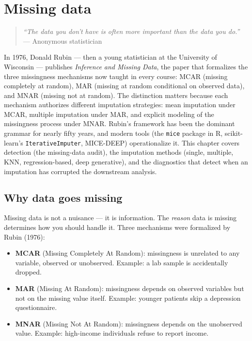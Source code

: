 \chapter{Missing data}
\label{ch:missing-data}

\begin{quote}
\emph{``The data you don't have is often more important than the data you do.''}
--- Anonymous statistician
\end{quote}

In 1976, Donald Rubin --- then a young statistician at the University of Wisconsin --- publishes \emph{Inference and Missing Data}, the paper that formalizes the three missingness mechanisms now taught in every course: MCAR (missing completely at random), MAR (missing at random conditional on observed data), and MNAR (missing not at random). The distinction matters because each mechanism authorizes different imputation strategies: mean imputation under MCAR, multiple imputation under MAR, and explicit modeling of the missingness process under MNAR. Rubin's framework has been the dominant grammar for nearly fifty years, and modern tools (the \texttt{mice} package in R, scikit-learn's \texttt{IterativeImputer}, MICE-DEEP) operationalize it. This chapter covers detection (the missing-data audit), the imputation methods (single, multiple, KNN, regression-based, deep generative), and the diagnostics that detect when an imputation has corrupted the downstream analysis.

\section{Why data goes missing}

Missing data is not a nuisance --- it is information. The \emph{reason} data is missing determines how you should handle it. Three mechanisms were formalized by Rubin (1976):

\begin{definition}
\begin{itemize}
  \item \textbf{MCAR} (Missing Completely At Random): missingness is unrelated to any variable, observed or unobserved. Example: a lab sample is accidentally dropped.
  \item \textbf{MAR} (Missing At Random): missingness depends on observed variables but not on the missing value itself. Example: younger patients skip a depression questionnaire.
  \item \textbf{MNAR} (Missing Not At Random): missingness depends on the unobserved value. Example: high-income individuals refuse to report income.
\end{itemize}
\end{definition}

